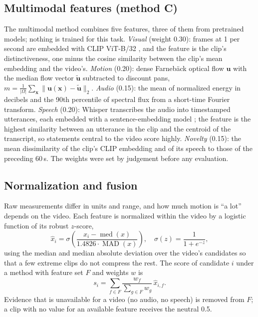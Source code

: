 \documentclass[conference]{IEEEtran}
\begin{document}
\subsection{Multimodal features (method C)}
The multimodal method combines five features, three of them from pretrained models; nothing is trained for this task. \emph{Visual} (weight 0.30): frames at 1 per second are embedded with CLIP ViT-B/32 \cite{radford2021clip}, and the feature is the clip's distinctiveness, one minus the cosine similarity between the clip's mean embedding and the video's. \emph{Motion} (0.20): dense Farneb\"ack optical flow \cite{farneback2003} $\mathbf{u}$ with the median flow vector $\tilde{\mathbf{u}}$ subtracted to discount pans, $m = \frac{1}{|\Omega|}\sum_{\mathbf{x}} \lVert \mathbf{u}(\mathbf{x}) - \tilde{\mathbf{u}} \rVert_2$. \emph{Audio} (0.15): the mean of normalized energy in decibels and the 90th percentile of spectral flux from a short-time Fourier transform. \emph{Speech} (0.20): Whisper \cite{radford2023whisper} transcribes the audio into timestamped utterances, each embedded with a sentence-embedding model \cite{reimers2019sbert}; the feature is the highest similarity between an utterance in the clip and the centroid of the transcript, so statements central to the video score highly. \emph{Novelty} (0.15): the mean dissimilarity of the clip's CLIP embedding and of its speech to those of the preceding 60\,s. The weights were set by judgement before any evaluation.

\subsection{Normalization and fusion}
Raw measurements differ in units and range, and how much motion is ``a lot'' depends on the video. Each feature is normalized within the video by a logistic function of its robust $z$-score,
\begin{equation}
\hat{x}_i = \sigma\!\left(\frac{x_i - \operatorname{med}(x)}{1.4826 \cdot \operatorname{MAD}(x)}\right), \quad \sigma(z) = \frac{1}{1 + e^{-z}} ,
\end{equation}
using the median and median absolute deviation over the video's candidates so that a few extreme clips do not compress the rest. The score of candidate $i$ under a method with feature set $F$ and weights $w$ is
\begin{equation}
s_i = \sum_{f \in F} \frac{w_f}{\sum_{g \in F} w_g}\, \hat{x}_{i,f} .
\end{equation}
Evidence that is unavailable for a video (no audio, no speech) is removed from $F$; a clip with no value for an available feature receives the neutral 0.5.
\end{document}
